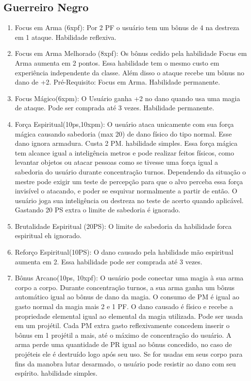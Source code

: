  
  \subsection{Guerreiro Negro}
  
  
\begin{enumerate}

	\item Focus em Arma (6xpf): Por 2 PF o usuário tem um bônus de 4 na destreza em 1 ataque. Habilidade reflexiva.

	\item Focus em Arma Melhorado (8xpf): Os bônus cedido pela habilidade Focus em Arma aumenta em 2 pontos. Essa habilidade tem o mesmo custo em experiência independente da classe. Além disso o ataque recebe um bônus no dano de +2. Pré-Requisito: Focus em Arma. Habilidade permanente.

	\item Focus Mágico(6xpm): O Usuário ganha +2 no dano quando usa uma magia de ataque. Pode ser comprada até 3 vezes. Habilidade permanente.	
 	
 	\item Força Espiritual(10ps,10xpm): O usuário ataca unicamente com sua força mágica causando sabedoria (max 20) de dano físico do tipo normal. Esse dano ignora armadura. Custa 2 PM. habilidade simples. Essa força mágica tem alcance igual a inteligência metros e pode realizar feitos físicos, como levantar objetos ou atacar pessoas como se tivesse uma força igual a sabedoria do usuário durante concentração turnos. Dependendo da situação o mestre pode exigir um teste de percepção para que o alvo perceba essa força invisível o atacando, e poder se esquivar normalmente a partir de então. O usuário joga sua inteligência ou destreza no teste de acerto quando aplicável. Gastando 20 PS extra o limite de sabedoria é ignorado.  
 	
 	\item Brutalidade Espiritual (20PS): O limite de sabedoria da habilidade forca espiritual eh ignorado.
 	
 	\item Reforço Espiritual(10PS): O dano causado pela habilidade mão espiritual aumenta em 2. Essa habilidade pode ser comprada até 3 vezes.

	\item Bônus Arcano(10ps, 10xpf): O usuário pode conectar uma magia à sua arma corpo a corpo. Durante concentração turnos, a sua arma ganha um bônus automático igual ao bônus de dano da magia. O consumo de PM é igual ao gasto normal da magia mais 2 e 1 PF. O dano causado é físico e recebe a propriedade elemental igual ao elemental da magia utilizada. Pode ser usada em um projétil. Cada PM extra gasto reflexivamente concedem inserir o bônus em 1 projétil a mais, até o máximo de concentração do usuário. A arma perde uma quantidade de PR igual ao bônus concedido, no caso de projéteis ele é destruído logo após seu uso. Se for usadas em seus corpo para fins da manobra lutar desarmado, o usuário pode resistir ao dano com seu espírito. habilidade simples.


\end{enumerate}
